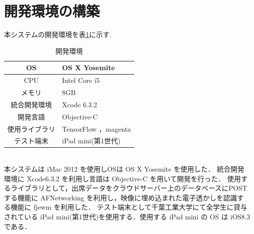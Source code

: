 \section{開発環境の構築}
本システムの開発環境を表\ref{tab:開発環境}に示す.
\begin{table}[h]
    \begin{center}
    \caption{開発環境}
    \label{tab:開発環境}
    \begin{tabular}{|c|p{}|}
    \hline
    OS & OS X Yosemite\\
    \hline
    CPU & Intel Core i5\\
    \hline
    メモリ & 8GB\\
    \hline
    統合開発環境 & Xcode 6.3.2\\
    \hline
    開発言語 & Objective-C\\
    \hline
    使用ライブラリ & TensorFlow ，magenta\\
    \hline
    テスト端末 & iPad mini(第1世代)\\
    \hline
    \end{tabular}
    \end{center}
\end{table}\\
本システムは iMac 2012 を使用しOSは OS X Yosemite を使用した．
統合開発環境に Xcode6.3.2 を利用し言語は Objective-C を用いて開発を行った．
使用するライブラリとして，出席データをクラウドサーバー上のデータベースにPOSTする機能に AFNetworking を利用し，映像に埋め込まれた電子透かしを認識する機能に fjewm を利用した．
テスト端末として千葉工業大学にて全学生に貸与されている iPad mini(第1世代)を使用する．使用する iPad mini の OS は iOS8.3 である．